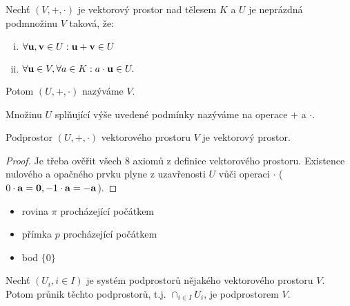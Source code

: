 \begin{definition}
    Nechť $(V, +, \cdot)$ je vektorový prostor nad tělesem $K$ a $U$ je 
    neprázdná podmnožinu $V$ taková, že:
    \begin{enumerate}[i.]
        \item $\forall \mathbf{u},\mathbf{v} \in U: \mathbf{u} + \mathbf{v} \in U$
        \item $\forall \mathbf{u} \in V, \forall a \in K: a\cdot \mathbf{u} \in U.$
    \end{enumerate}
    Potom $(U, +, \cdot)$ nazýváme  $V$.
\end{definition}

\begin{remark}
    Množinu $U$ splňující výše uvedené podmínky nazýváme  
    na operace $+$ a $\cdot$.
\end{remark}

\begin{observation}
    Podprostor $(U, +, \cdot)$ vektorového prostoru $V$ je vektorový 
    prostor.
\end{observation}

\begin{proof}
    Je třeba ověřit všech 8 axiomů z definice vektorového prostoru. Existence
    nulového a opačného prvku plyne z uzavřenosti $U$ vůči operaci $\cdot$ 
    ($0 \cdot \mathbf{a} = \mathbf{0}, -1 \cdot \mathbf{a} = -\mathbf{a}$).
\end{proof}

\begin{remark}
    \leavevmode
    \begin{itemize}
        \item
            rovina $\pi$ procházející počátkem
        \item přímka $p$ procházející počátkem
        \item bod $\{0\}$
    \end{itemize}
\end{remark}

\begin{proposition}
    Nechť $(U_i, i \in I)$ je systém podprostorů nějakého vektorového prostoru
    $V$. Potom průnik těchto podprostorů, t.j. $\cap_{i \in I} U_i$, je
    podprostorem $V$.
\end{proposition}

